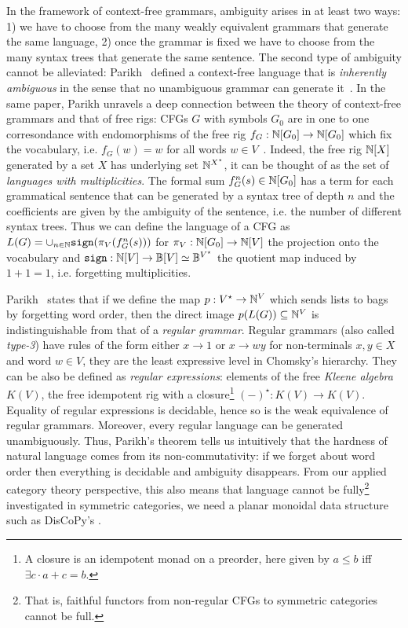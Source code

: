 In the framework of context-free grammars, ambiguity arises in at least two ways: 1) we have to choose from the many weakly equivalent grammars that generate the same language, 2) once the grammar is fixed we have to choose from the many syntax trees that generate the same sentence.
The second type of ambiguity cannot be alleviated: Parikh~\cite{Parikh61,Parikh66} defined a context-free language that is \emph{inherently ambiguous} in the sense that no unambiguous grammar can generate it~\cite[Theorem~29]{Chomsky63}.
In the same paper, Parikh unravels a deep connection between the theory of context-free grammars and that of free rigs: CFGs $G$ with symbols $G_0$ are in one to one corresondance with endomorphisms of the free rig $f_G : \mathbb{N}[G_0] \to \mathbb{N}[G_0]$ which fix the vocabulary, i.e. $f_G(w) = w$ for all words $w \in V$~\cite[Section~3]{Parikh66}.
Indeed, the free rig $\mathbb{N}[X]$ generated by a set $X$ has underlying set $\mathbb{N}^{X^\star}$, it can be thought of as the set of \emph{languages with multiplicities}.
The formal sum $f_G^n(s) \in \mathbb{N}[G_0]$ has a term for each grammatical sentence that can be generated by a syntax tree of depth $n$ and the coefficients are given by the ambiguity of the sentence, i.e. the number of different syntax trees.
Thus we can define the language of a CFG as $L(G) = \cup_{n \in \mathbb{N}} \mathtt{sign}(\pi_V(f_G^n(s)))$ for $\pi_V : \mathbb{N}[G_0] \to \mathbb{N}[V]$ the projection onto the vocabulary and $\mathtt{sign} : \mathbb{N}[V] \to \mathbb{B}[V] \simeq \mathbb{B}^{V^\star}$ the quotient map induced by $1 + 1 = 1$, i.e. forgetting multiplicities.

Parikh~\cite[Theorem~2]{Parikh66} states that if we define the map $p : V^\star \to \mathbb{N}^V$ which sends lists to bags by forgetting word order, then the direct image $p(L(G)) \subseteq \mathbb{N}^V$ is indistinguishable from that of a \emph{regular grammar}.
Regular grammars (also called \emph{type-3}) have rules of the form either $x \to 1$ or $x \to w y$ for non-terminals $x, y \in X$ and word $w \in V$, they are the least expressive level in Chomsky's hierarchy.
They can be also be defined as \emph{regular expressions}: elements of the free \emph{Kleene algebra} $K(V)$, the free idempotent rig with a closure\footnote
{A closure is an idempotent monad on a preorder, here given by $a \leq b$ iff $\exists c \cdot a + c = b$.} $(-)^\star : K(V) \to K(V)$.
Equality of regular expressions is decidable, hence so is the weak equivalence of regular grammars.
Moreover, every regular language can be generated unambiguously.
Thus, Parikh's theorem tells us intuitively that the hardness of natural language comes from its non-commutativity: if we forget about word order then everything is decidable and ambiguity disappears.
From our applied category theory perspective, this also means that language cannot be fully\footnote
{That is, faithful functors from non-regular CFGs to symmetric categories cannot be full.} investigated in symmetric categories, we need a planar monoidal data structure such as DisCoPy's .
